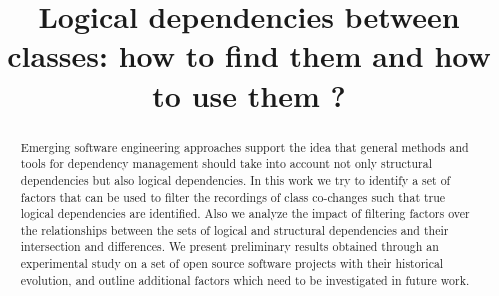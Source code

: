 \documentclass[conference]{IEEEtran}
\begin{document}
%

\title{Logical dependencies between classes: how to find them and how to use them ?}


\author{
\and
{}

}










\maketitle

\begin{abstract}

Emerging software engineering approaches support the idea that general methods and tools for dependency management should take into account not only structural dependencies but also logical dependencies. In this work we try to identify a set of factors that can be used to filter the recordings of class co-changes such that true logical dependencies are identified. Also we analyze the impact of filtering factors over the relationships between the sets of logical and structural dependencies and their intersection and differences. We present preliminary results obtained through an experimental study on a set of open source software projects with their historical evolution, and outline additional factors which need to be investigated in future work.

\end{abstract}
\end{document}
